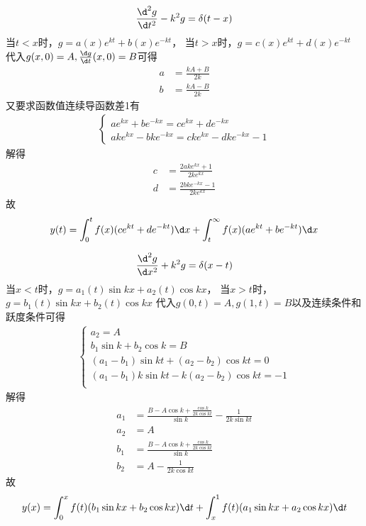 \documentclass{phyasgn}
\begin{document}
\begin{sol}[1]
\begin{align*}
    \frac{\d^2 g}{\d t^2}-k^2g=\delta(t-x)
\end{align*}
当$t<x$时，$g=a(x)e^{kt}+b(x)e^{-kt}$，
当$t>x$时，$g=c(x)e^{kt}+d(x)e^{-kt}$
代入$g(x,0)=A,\frac{\d g}{\d t}(x,0)=B$可得
\begin{align*}
    a&=\frac{kA+B}{2k}\\
    b&=\frac{kA-B}{2k}
\end{align*} 
又要求函数值连续导函数差1有
\begin{align*}
  \left\{\begin{matrix}
    ae^{kx}+be^{-kx}=ce^{kx}+de^{-kx}\\
    ake^{kx}-bke^{-kx}=cke^{kx}-dke^{-kx}-1
  \end{matrix}\right.
\end{align*}
解得
\begin{align*}
  c&=\frac{2ake^{kx}+1}{2ke^{kx}}\\
  d&=\frac{2bke^{-kx}-1}{2ke^{kx}}
\end{align*} 
故\begin{align*}
  y(t)=\int_{0}^{t}f(x)(ce^{kt}+de^{-kt})\d x+\int_{t}^{\infty}f(x)(ae^{kt}+be^{-kt})\d x
\end{align*}
\end{sol}\par

\begin{sol}[2]
  \begin{align*}
    \frac{\d^2 g}{\d x^2}+k^2g=\delta(x-t)
\end{align*}
当$x<t$时，$g=a_1(t)\sin kx+a_2(t)\cos kx$，
当$x>t$时，$g=b_1(t)\sin kx+b_2(t)\cos kx$
代入$g(0,t)=A,g(1,t)=B$以及连续条件和跃度条件可得
\begin{align*}
  \left\{\begin{matrix}
    a_2=A\\
    b_1\sin k+b_2\cos k=B\\
    (a_1-b_1)\sin kt+(a_2-b_2)\cos kt=0\\
    (a_1-b_1)k\sin kt-k(a_2-b_2)\cos kt=-1\\
  \end{matrix}\right.
\end{align*}
解得
\begin{align*}
  a_1&=\frac{B-A\cos k+\frac{\cos k}{2k\cos kt}}{\sin k}-\frac{1}{2k\sin kt }\\
  a_2&=A\\
  b_1&=\frac{B-A\cos k+\frac{\cos k}{2k\cos kt}}{\sin k}\\
  b_2&=A-\frac{1}{2k\cos kt}
\end{align*} 
故\begin{align*}
  y(x)=\int_{0}^{x}f(t)(b_1\sin kx+b_2\cos kx)\d t+\int_{x}^{1}f(t)(a_1\sin kx+a_2\cos kx)\d t
\end{align*}
\end{sol}\par
\end{document}
